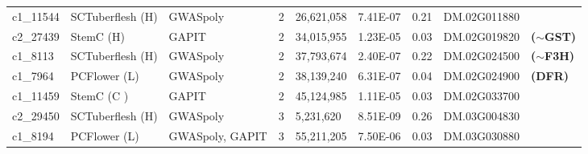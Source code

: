 \documentclass[pdflatex,sn-mathphys-ay]{sn-jnl}%
\begin{document}
\begin{landscape}
\begin{table}[]
\begin{tabular}{lllllllll}
c1\_11544                        & SCTuberflesh (H)                        & GWASpoly                        & 2                        & 26,621,058                        & 7.41E-07                        & 0.21                        & DM.02G011880                        &                                                                              \\
\rowcolor[HTML]{FFFFD7} 
c2\_27439                        & StemC (H)                               & GAPIT                           & 2                        & 34,015,955                        & 1.23E-05                        & 0.03                        & DM.02G019820                        & \textbf{($\sim$GST)}\citep{riveros2022uncovering}                                          \\
\rowcolor[HTML]{FFFFD7} 
c1\_8113                         & SCTuberflesh (H)                        & GWASpoly                        & 2                        & 37,793,674                        & 2.40E-07                        & 0.22                        & DM.02G024500                        & \textbf{($\sim$F3H)}\citep{riveros2022uncovering}                                          \\
\rowcolor[HTML]{DDE8CB} 
c1\_7964                         & PCFlower (L)                            & GWASpoly                        & 2                        & 38,139,240                        & 6.31E-07                        & 0.04                        & DM.02G024900                        & \textbf{(DFR)}\citep{riveros2022uncovering}                                          \\
\rowcolor[HTML]{FFFFD7} 
c1\_11459                        & StemC (C )                              & GAPIT                           & 2                        & 45,124,985                        & 1.11E-05                        & 0.03                        & DM.02G033700                        & \citep{sharma2024genotyping,berdugo2023phenotypic,Berdugo2017}\\
c2\_29450                        & SCTuberflesh (H)                        & GWASpoly                        & 3                        & 5,231,620                         & 8.51E-09                        & 0.26                        & DM.03G004830                        &                                                                              \\
\rowcolor[HTML]{FFFFD7} 
c1\_8194                         & PCFlower (L)                            & GWASpoly, GAPIT                 & 3                        & 55,211,205                        & 7.50E-06                        & 0.03                        & DM.03G030880                        & \citep{pandey2022genomic}                                                        \\

\end{tabular}
\end{table}
\end{landscape}
\end{document}
